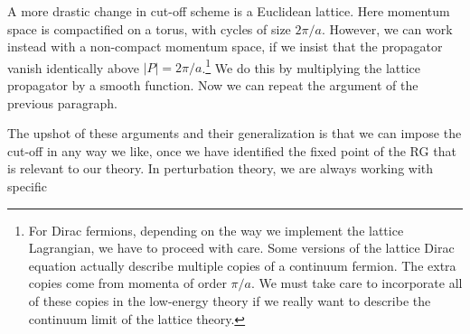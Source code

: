 A more drastic change in cut-off scheme is a Euclidean lattice. Here momentum
space is compactified on a torus, with cycles of size $2\pi/a$. However, we
can work instead with a non-compact momentum space, if we insist that the
propagator vanish identically above $|P|=2\pi/a$.\footnote[6]{For Dirac
fermions, depending on the way we implement the lattice Lagrangian, we have
to proceed with care. Some versions of the lattice Dirac equation actually
describe multiple copies of a continuum fermion. The extra copies come from
momenta of order $\pi/a$. We must take care to incorporate all of these
copies in the low-energy theory if we really want to describe the continuum
limit of the lattice theory.} We do this by multiplying the lattice
propagator by a smooth function. Now we can repeat the argument of the
previous paragraph.

The upshot of these arguments and their generalization is that we can impose
the cut-off in any way we like, once we have identified the fixed point of the
RG that is relevant to our theory. In perturbation theory, we are always
working with specific
